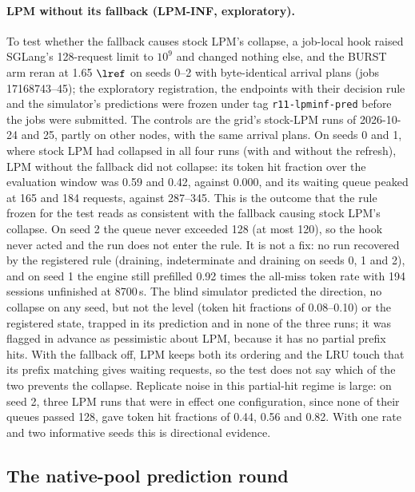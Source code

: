 \paragraph{LPM without its fallback (LPM-INF, exploratory).} To test whether the fallback causes stock LPM's collapse, a job-local hook raised SGLang's 128-request limit to $10^9$ and changed nothing else, and the BURST arm reran at 1.65 $\lref$ on seeds 0--2 with byte-identical arrival plans (jobs 17168743--45); the exploratory registration, the endpoints with their decision rule and the simulator's predictions were frozen under tag \texttt{r11-lpminf-pred} before the jobs were submitted. The controls are the grid's stock-LPM runs of 2026-10-24 and 25, partly on other nodes, with the same arrival plans. On seeds 0 and 1, where stock LPM had collapsed in all four runs (with and without the refresh), LPM without the fallback did not collapse: its token hit fraction over the evaluation window was 0.59 and 0.42, against 0.000, and its waiting queue peaked at 165 and 184 requests, against 287--345. This is the outcome that the rule frozen for the test reads as consistent with the fallback causing stock LPM's collapse. On seed 2 the queue never exceeded 128 (at most 120), so the hook never acted and the run does not enter the rule. It is not a fix: no run recovered by the registered rule (draining, indeterminate and draining on seeds 0, 1 and 2), and on seed 1 the engine still prefilled 0.92 times the all-miss token rate with 194 sessions unfinished at 8700\,s. The blind simulator predicted the direction, no collapse on any seed, but not the level (token hit fractions of 0.08--0.10) or the registered state, trapped in its prediction and in none of the three runs; it was flagged in advance as pessimistic about LPM, because it has no partial prefix hits. With the fallback off, LPM keeps both its ordering and the LRU touch that its prefix matching gives waiting requests, so the test does not say which of the two prevents the collapse. Replicate noise in this partial-hit regime is large: on seed 2, three LPM runs that were in effect one configuration, since none of their queues passed 128, gave token hit fractions of 0.44, 0.56 and 0.82. With one rate and two informative seeds this is directional evidence.

\subsection{The native-pool prediction round}
